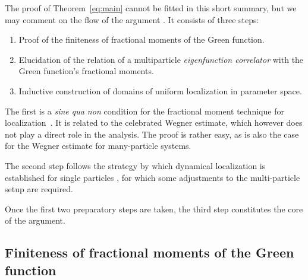 \documentclass[reqno,keywordsasfootnote]{article}
\numberwithin{equation}{section}
\theoremstyle{definition}
\begin{document}
The proof of Theorem~\ref{eq:main} cannot be fitted in this short summary, but we may comment on  the flow of the argument \cite{AW09}.  It  consists of three steps:
\begin{enumerate}
\item  Proof of the finiteness of fractional moments of the Green function. 
\item  Elucidation of the relation of a multiparticle  \emph{eigenfunction correlator} with the Green function's fractional moments.
\item Inductive construction of domains of uniform localization in parameter space.
\end{enumerate}
The first is a  \emph{sine qua non} condition for the  
fractional moment technique for localization~\cite{AM}.  
It is related to the celebrated Wegner estimate, which however  does not play a direct role in the analysis.    The proof is rather easy, as is also the case  for the   Wegner estimate for many-particle systems.  

The second step follows the strategy by which 
dynamical localization is established for single particles \cite{A2}, for which some adjustments to the multi-particle setup are required.
 
Once the first two preparatory steps are taken, the third step  constitutes the core of the argument.   

\subsection{Finiteness of fractional moments of the Green function }
\end{document}
